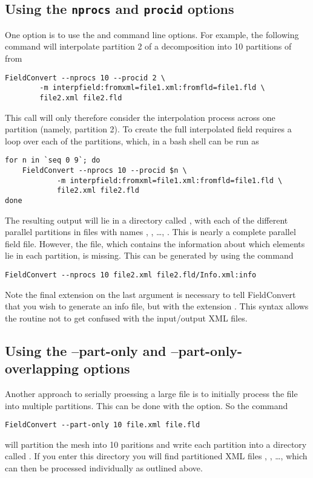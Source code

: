 \subsection{Using the \texttt{nprocs} and \texttt{procid} options}

One option is to use the  and  command line
options. For example, the following command will interpolate partition 2 of a
decomposition into 10 partitions of  from 
\begin{lstlisting}[style=BashInputStyle]
FieldConvert --nprocs 10 --procid 2 \
        -m interpfield:fromxml=file1.xml:fromfld=file1.fld \
        file2.xml file2.fld
\end{lstlisting}
This call will only therefore consider the interpolation process across one
partition (namely, partition 2). To create the full interpolated field requires
a loop over each of the partitions, which, in a bash shell can be run as
\begin{lstlisting}[style=BashInputStyle] 
for n in `seq 0 9`; do
    FieldConvert --nprocs 10 --procid $n \
            -m interpfield:fromxml=file1.xml:fromfld=file1.fld \
            file2.xml file2.fld
done
\end{lstlisting}
The resulting output will lie in a directory called , with each
of the different parallel partitions in files with names ,
, \dots, . This is nearly a complete
parallel field file. However, the  file, which contains the
information about which elements lie in each partition, is missing. This can be
generated by using the command
\begin{lstlisting}[style=BashInputStyle] 
FieldConvert --nprocs 10 file2.xml file2.fld/Info.xml:info
\end{lstlisting}
Note the final \inltt{:info} extension on the last argument is necessary to tell
FieldConvert that you wish to generate an info file, but with the extension
\inltt{.xml}. This syntax allows the routine not to get confused with the
input/output XML files.

\subsection{Using the --part-only and --part-only-overlapping options}

Another approach to serially proessing a large file is to initially process the
file into multiple partitions. This can be done with the 
option. So the command
\begin{lstlisting}[style=BashInputStyle] 
FieldConvert --part-only 10 file.xml file.fld
\end{lstlisting}
will partition the mesh into 10 paritions and write each partition into a
directory called \inltt{file\_xml}. If you enter this directory you will find
partitioned XML files \inltt{P0000000.xml}, , \dots,
 which can then be processed individually as outlined above.

